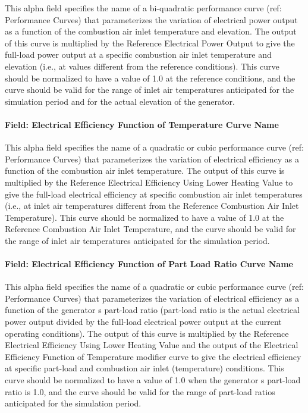This alpha field specifies the name of a bi-quadratic performance curve (ref: Performance Curves) that parameterizes the variation of electrical power output as a function of the combustion air inlet temperature and elevation. The output of this curve is multiplied by the Reference Electrical Power Output to give the full-load power output at a specific combustion air inlet temperature and elevation (i.e., at values different from the reference conditions). This curve should be normalized to have a value of 1.0 at the reference conditions, and the curve should be valid for the range of inlet air temperatures anticipated for the simulation period and for the actual elevation of the generator.

\paragraph{Field: Electrical Efficiency Function of Temperature Curve Name}\label{field-electrical-efficiency-function-of-temperature-curve-name}

This alpha field specifies the name of a quadratic or cubic performance curve (ref: Performance Curves) that parameterizes the variation of electrical efficiency as a function of the combustion air inlet temperature. The output of this curve is multiplied by the Reference Electrical Efficiency Using Lower Heating Value to give the full-load electrical efficiency at specific combustion air inlet temperatures (i.e., at inlet air temperatures different from the Reference Combustion Air Inlet Temperature). This curve should be normalized to have a value of 1.0 at the Reference Combustion Air Inlet Temperature, and the curve should be valid for the range of inlet air temperatures anticipated for the simulation period.

\paragraph{Field: Electrical Efficiency Function of Part Load Ratio Curve Name}\label{field-electrical-efficiency-function-of-part-load-ratio-curve-name}

This alpha field specifies the name of a quadratic or cubic performance curve (ref: Performance Curves) that parameterizes the variation of electrical efficiency as a function of the generator s part-load ratio (part-load ratio is the actual electrical power output divided by the full-load electrical power output at the current operating conditions). The output of this curve is multiplied by the Reference Electrical Efficiency Using Lower Heating Value and the output of the Electrical Efficiency Function of Temperature modifier curve to give the electrical efficiency at specific part-load and combustion air inlet (temperature) conditions. This curve should be normalized to have a value of 1.0 when the generator s part-load ratio is 1.0, and the curve should be valid for the range of part-load ratios anticipated for the simulation period.

